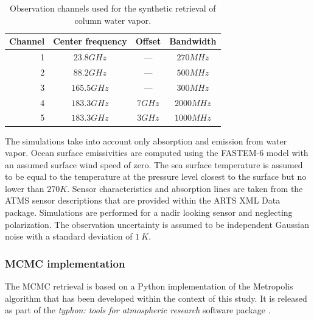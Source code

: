 \documentclass[journal abbreviation, manuscript]{copernicus}
\begin{document}
\begin{table}[hbpt]
\centering
\begin{tabular}{|r|c|c|c|}
    \hline
    Channel & Center frequency & Offset           & Bandwidth                \\ 
    \hline
                  1 & $23.8 \unit{GHz}$ &        ---       & $270 \unit{MHz}$ \\
                  2 & $88.2 \unit{GHz}$ &        ---       & $500 \unit{MHz}$ \\
                  3 & $165.5\unit{GHz}$ &        ---       & $300 \unit{MHz}$ \\
                  4 & $183.3\unit{GHz}$ & $7   \unit{GHz}$ & $2000\unit{MHz}$ \\
                  5 & $183.3\unit{GHz}$ & $3   \unit{GHz}$ & $1000\unit{MHz}$ \\
    \hline
\end{tabular}
\caption{Observation channels used for the synthetic retrieval of column water vapor.}
\label{tab:channels}
\end{table}

The simulations take into account only absorption and emission from water vapor.
Ocean surface emissivities are computed using the FASTEM-6 \citep{fastem6} model
with an assumed surface wind speed of zero. The sea surface temperature is
assumed to be equal to the temperature at the pressure level closest to the
surface but no lower than $270\unit{K}$. Sensor characteristics and absorption
lines are taken from the ATMS sensor descriptions that are provided within the
ARTS XML Data package. Simulations are performed for a nadir looking sensor and
neglecting polarization. The observation uncertainty is assumed to be
independent Gaussian noise with a standard deviation of $1\:\unit{K}$.


\subsubsection{MCMC implementation}

  The MCMC retrieval is based on a Python implementation of the Metropolis
  algorithm \citep[Ch. 12]{bda} that has been developed within the context of
  this study. It is released as part of the \textit{typhon: tools for atmospheric
  research} software package \citep{typhon}.
\end{document}
